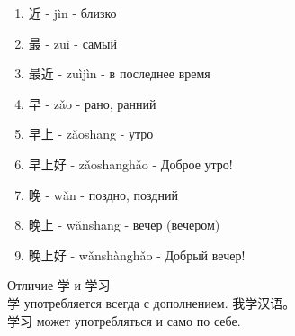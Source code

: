 \begin{newwords}
\begin{enumerate}
		\item 近 - jìn - близко
		\item 最 - zuì - самый
		\item 最近 - zuìjìn - в последнее время
		\item 早 - zǎo - рано, ранний
		\item 早上 - zǎoshang - утро
		\item 早上好 - zǎoshanghǎo - Доброе утро!
		\item 晚 - wǎn - поздно, поздний
		\item 晚上 - wǎnshang - вечер (вечером)
		\item 晚上好 - wǎnshànghǎo - Добрый вечер!
	\end{enumerate}
\end{newwords}
Отличие 学 и 学习\\
学 употребляется всегда с дополнением. 我学汉语。\\
学习 может употребляться и само по себе.